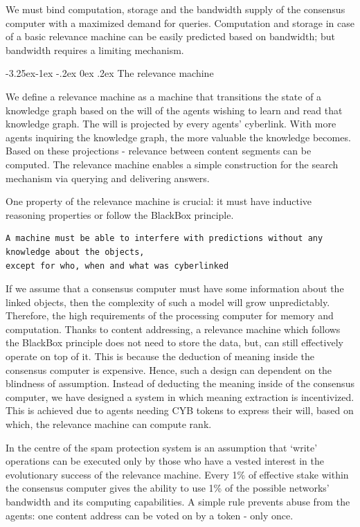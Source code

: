 \documentclass[8pt,oneside]{amsart}
\makeatletter
\renewcommand\subsection{\@startsection{subsection}{2}{\z@}%
                                     {-3.25ex\@plus -1ex \@minus -.2ex}%
                                     {0ex \@plus .2ex}%
                                     {\play\Large}}%
\newcommand{\titleSection}[1]{\subsection{#1}}
\makeatother
\begin{document}
\begin{Abstract}
We must bind computation, storage and the bandwidth supply of the consensus computer with a maximized demand for queries. Computation and storage in case of a basic relevance machine can be easily predicted based on bandwidth; but bandwidth requires a limiting mechanism.

\titleSection{The relevance machine}\label{The relevance-machine}

We define a relevance machine as a machine that transitions the state of a knowledge graph based on the will of the agents wishing to learn and read that knowledge graph. The will is projected by every agents' cyberlink. With more agents inquiring the knowledge graph, the more valuable the knowledge becomes. Based on these projections - relevance between content segments can be computed. The relevance machine enables a simple construction for the search mechanism via querying and delivering answers.

One property of the relevance machine is crucial: it must have inductive reasoning properties or follow the BlackBox principle.

\begin{lstlisting}
A machine must be able to interfere with predictions without any knowledge about the objects,
except for who, when and what was cyberlinked
\end{lstlisting}

If we assume that a consensus computer must have some information about the linked objects, then the complexity of such a model will grow unpredictably. Therefore, the high requirements of the processing computer for memory and computation. Thanks to content addressing, a relevance machine which follows the BlackBox principle does not need to store the data, but, can still effectively operate on top of it. This is because the deduction of meaning inside the consensus computer is expensive. Hence, such a design can dependent on the blindness of assumption. Instead of deducting the meaning inside of the consensus computer, we have designed a system in which meaning extraction is incentivized. This is achieved due to agents needing CYB tokens to express their will, based on which, the relevance machine can compute rank.

In the centre of the spam protection system is an assumption that ‘write’ operations can be executed only by those who have a vested interest in the evolutionary success of the relevance machine. Every 1\% of effective stake within the consensus computer gives the ability to use 1\% of the possible networks' bandwidth and its computing capabilities. A simple rule prevents abuse from the agents: one content address can be voted on by a token - only once.


\end{Abstract}
\end{document}
